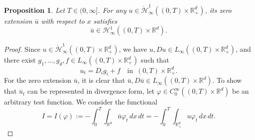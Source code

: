 \documentclass[reqno]{amsart}
\numberwithin{equation}{section}
\theoremstyle{plain}
\newtheorem{proposition}[theorem]{Proposition}
\theoremstyle{definition}
\def\bR{\mathbb{R}}
\def\cH{\mathcal{H}}
\begin{document}
\begin{proposition} \label{prop_inf}
Let $T \in (0, \infty]$. For any $u \in \mathring{\cH}^1_\infty((0,T)\times \bR^d_+)$, its zero extension $\bar{u}$ with respect to $x$ satisfies
$$
\bar{u} \in \cH^1_\infty((0,T)\times \bR^d).
$$
\end{proposition}
\begin{proof}
Since $u \in \mathring{\cH}^1_\infty((0,T)\times \bR^d_+)$, we have $u, Du \in L_\infty((0,T)\times \bR^d_+)$, and there exist $g_1, \ldots, g_d, f \in L_\infty((0,T)\times \bR^d_+)$ such that
\begin{equation}		\label{260616_eq1}
u_t = D_i g_i + f \quad \text{in }\, (0,T)\times \bR^d_+.
\end{equation}
For the zero extension $\bar{u}$, it is clear that $\bar{u}, D\bar{u} \in L_\infty((0,T)\times \bR^d)$.
To show that $\bar{u}_t$ can be represented in divergence form, let $\varphi \in C^\infty_0((0,T)\times \bR^d)$ be an arbitrary test function.
We consider the functional
$$
I = I(\varphi) := -\int_0^T \int_{\bR^d} \bar{u} \varphi_t \,dx\,dt = -\int_0^T \int_{\bR^d_+} u \varphi_t \,dx\,dt.
$$


\end{proof}
\end{document}
